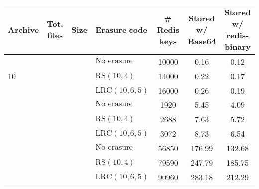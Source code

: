 \begin{tabular}{
        l
        c
        c
        l
        S[table-format=5.0]
        S[table-format=3.2]
        S[table-format=3.2]
}
\toprule
Archive & Tot. files & Size & Erasure code & {\# Redis keys} & {Stored w/ Base64} & {Stored w/ redis-binary} \\

\midrule

 &  &  & $\text{No erasure coding}$ & 10000 & 0.16 & 0.12 \\
 & & & $\text{RS}\left(10,4\right)$ & 14000 & 0.22 & 0.17 \\
 & & & $\text{LRC}\left(10,6,5\right)$ & 16000 & 0.26 & 0.19 \\

\addlinespace
 &  &  & $\text{No erasure coding}$ & 1920 & 5.45 & 4.09 \\
 & & & $\text{RS}\left(10,4\right)$ & 2688 & 7.63 & 5.72 \\
 & & & $\text{LRC}\left(10,6,5\right)$ & 3072 & 8.73 & 6.54 \\

\addlinespace
 &  &  & $\text{No erasure coding}$ & 56850 & 176.99 & 132.68 \\
 & & & $\text{RS}\left(10,4\right)$ & 79590 & 247.79 & 185.75 \\
 & & & $\text{LRC}\left(10,6,5\right)$ & 90960 & 283.18 & 212.29 \\
\bottomrule
\end{tabular}
